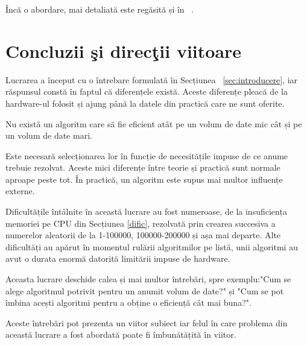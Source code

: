 \documentclass[12pt]{article}
\begin{document}
Încă o abordare, mai detaliată este regăsită și în ~\cite{HUTTER201479}.
\section{Concluzii şi direcţii viitoare}
\label{sec:concluzii}
Lucrarea a început cu o întrebare formulată în Secțiunea
~\ref{sec:introducere}, iar răspunsul constă în faptul că diferențele există. Aceste diferențe pleacă de la hardware-ul folosit și ajung până la datele din practică care ne sunt oferite.

Nu există un algoritm care să fie eficient atât pe un volum de date mic cât și pe un volum de date mari. 


Este necesară selecționarea lor în funcție de necesitățile impuse de ce anume trebuie rezolvat.
Aceste mici diferențe între teorie și practică sunt normale aproape peste tot. În practică, un algoritm este supus mai multor influențe externe.

Dificultățile întâlnite în această lucrare au fost numeroase, de la insuficiența memoriei pe CPU din Secțiunea \ref{dific}, rezolvată prin crearea succesiva a numerelor aleatorii de la 1-100000, 100000-200000 și așa mai departe. Alte dificultăți au apărut în momentul rulării algoritmilor pe listă, unii algoritmi au avut o durata enormă datorită limitării impuse de hardware.

Aceasta lucrare deschide calea și mai multor întrebări, spre exemplu:"Cum se alege algoritmul potrivit pentru un anumit volum de date?" și "Cum se pot îmbina acești algoritmi pentru a obține o eficiență cât mai buna?".

Aceste întrebări pot prezenta un viitor subiect iar felul în care problema din această lucrare a fost abordată poate fi îmbunătățită în viitor.
\pagebreak
\printbibliography
\end{document}
